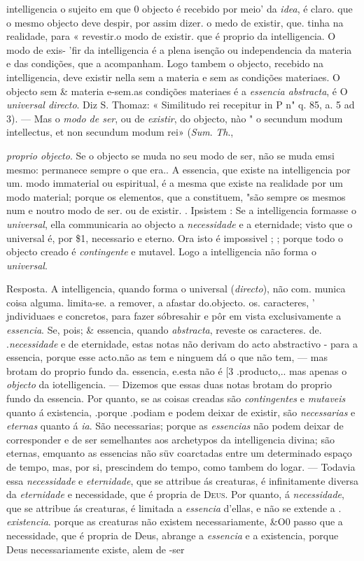 intelligencia o sujeito em que 0 objecto é recebido por meio' da \emph{idea}, é claro. que o mesmo objecto deve despir, por assim dizer. o medo de existir, que. tinha na realidade, para « revestir.o modo de existir. que é proprio da intelligencia. O modo de exis- 'fir da intelligencia é a plena isenção ou independencia da materia e das condições, que a acompanham. Logo tambem o objecto, recebido na intelligencia, deve existir nella sem a materia e sem as condições materiaes. O objecto sem \& materia e-sem.as condições materiaes é a \emph{essencia abstracta}, é O \emph{universal directo}. Diz S. Thomaz: « Similitudo rei recepitur in P n" q. 85, a. 5 ad 3). --- Mas o \emph{modo de ser}, ou de \emph{existir}, do objecto, nào " o secundum modum intellectus, et non secundum modum rei» (\emph{Sum}. \emph{Th}.,\par \emph{proprio objecto}. Se o objecto se muda no seu modo de ser, não se muda emsi mesmo: permanece sempre o que era.. A essencia, que existe na intelligencia por um. modo immaterial ou espiritual, é a mesma que existe na realidade por um modo material; porque os elementos, que a constituem, "são sempre os mesmos num e noutro modo de ser. ou de existir. . Ipsistem : Se a intelligencia formasse o \emph{universal}, ella communicaria ao objecto a \emph{necessidade} e a eternidade; visto que o universal é, por \$1, necessario e eterno. Ora isto é impossivel ; ; porque todo o objecto creado é \emph{contingente} e mutavel. Logo a intelligencia não forma o \emph{universal}.\par Resposta. A intelligencia, quando forma o universal (\emph{directo}), não com. munica coisa alguma. limita-se. a remover, a afastar do.objecto. os. caracteres, ' jndividuaes e concretos, para fazer sóbresahir e pôr em vista exclusivamente a \emph{essencia}. Se, pois; \& essencia, quando \emph{abstracta}, reveste os caracteres. de. .\emph{necessidade} e de eternidade, estas notas não derivam do acto abstractivo - para a essencia, porque esse acto.não as tem e ninguem dá o que não tem, --- mas brotam do proprio fundo da. essencia, e.esta não é [3 .producto,.. mas apenas o \emph{objecto} da iotelligencia. --- Dizemos que essas duas notas brotam do proprio fundo da essencia. Por quanto, se as coisas creadas são \emph{contingentes} e \emph{mutaveis} quanto á existencia, .porque .podiam e podem deixar de existir, são \emph{necessarias} e \emph{eternas} quanto á \emph{ia}. São necessarias; porque as \emph{essencias} não podem deixar de corresponder e de ser semelhantes aos archetypos da intelligencia divina; são eternas, emquanto as essencias não süv coarctadas entre um determinado espaço de tempo, mas, por si, prescindem do tempo, como tambem do logar. --- Todavia essa \emph{necessidade} e \emph{eternidade}, que se attribue ás creaturas, é infinitamente diversa da \emph{eternidade} e necessidade, que é propria de \textsc{Deus}. Por quanto, á \emph{necessidade}, que se attribue ás creaturas, é limitada a \emph{essencia} d'ellas, e não se extende a . \emph{existencia}. porque as creaturas não existem necessariamente, \&O0 passo que a necessidade, que é propria de Deus, abrange a \emph{essencia} e a existencia, porque Deus necessariamente existe, alem de -ser 